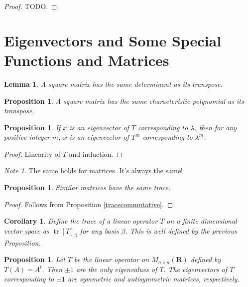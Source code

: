 \documentclass[12pt]{article}
\theoremstyle{plain}
\newtheorem{corollary}[theorem]{Corollary}
\newtheorem{lemma}[theorem]{Lemma}
\newtheorem{proposition}[theorem]{Proposition}
\theoremstyle{definition}
\theoremstyle{remark}
\newtheorem{note}[theorem]{Note}
\newcommand{\R}{\mathbf R}
\DeclareMathOperator{\tr}{tr}
\begin{document}
\begin{proof}
TODO.
\end{proof}

\section{Eigenvectors and Some Special Functions and Matrices}

\begin{lemma}
A square matrix has the same determinant as its transpose.
\end{lemma}

\begin{proposition}
A square matrix has the same characteristic polynomial as its transpose.
\end{proposition}

\begin{proposition}
If $x$ is an eigenvector of $T$ corresponding to $\lambda$, then for any positive integer $m$, $x$ is an eigenvector of $T^m$ corresponding to $\lambda^m$.
\end{proposition}

\begin{proof}
Linearity of $T$ and induction.
\end{proof}

\begin{note}
The same holds for matrices. It's always the same!
\end{note}

\begin{proposition}
Similar matrices have the same trace.
\end{proposition}

\begin{proof}
Follows from Proposition \ref{tracecommutative}.
\end{proof}

\begin{corollary}
Define the trace of a linear operator $T$ on a finite dimensional vector space as $\tr [T]_\beta$ for any basis $\beta$. This is well defined by the previous Proposition.
\end{corollary}

\begin{proposition}
Let $T$ be the linear operator on $M_{n\times n}(\R)$ defined by $T(A) = A^t.$ Then $\pm 1$ are the only eigenvalues of $T.$ The eigenvectors of $T$ corresponding to $\pm 1$ are symmetric and antisymmetric matrices, respectively.
\end{proposition}
\end{document}
